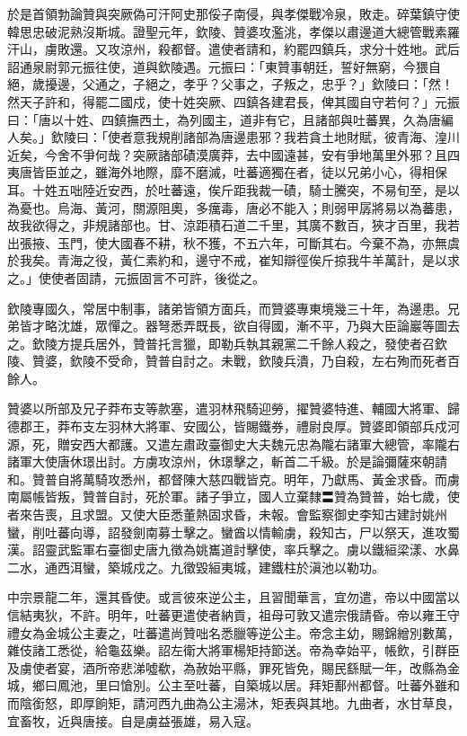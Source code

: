 \begin{pinyinscope}
 於是首領勃論贊與突厥偽可汗阿史那俀子南侵，與孝傑戰冷泉，敗走。碎葉鎮守使韓思忠破泥熟沒斯城。證聖元年，欽陵、贊婆攻濫洮，孝傑以肅邊道大總管戰素羅汗山，虜敗還。又攻涼州，殺都督。遣使者請和，約罷四鎮兵，求分十姓地。武后詔通泉尉郭元振往使，道與欽陵遇。元振曰：「東贊事朝廷，誓好無窮，今猥自絕，歲擾邊，父通之，子絕之，孝乎？父事之，子叛之，忠乎？」欽陵曰：「然！然天子許和，得罷二國戍，使十姓突厥、四鎮各建君長，俾其國自守若何？」元振曰：「唐以十姓、四鎮撫西土，為列國主，道非有它，且諸部與吐蕃異，久為唐編人矣。」欽陵曰：「使者意我規削諸部為唐邊患邪？我若貪土地財賦，彼青海、湟川近矣，今舍不爭何哉？突厥諸部磧漠廣莽，去中國遠甚，安有爭地萬里外邪？且四夷唐皆臣並之，雖海外地際，靡不磨滅，吐蕃適獨在者，徒以兄弟小心，得相保耳。十姓五咄陸近安西，於吐蕃遠，俟斤距我裁一磧，騎士騰突，不易旬至，是以為憂也。烏海、黃河，關源阻奧，多癘毒，唐必不能入；則弱甲孱將易以為蕃患，故我欲得之，非規諸部也。甘、涼距積石道二千里，其廣不數百，狹才百里，我若出張掖、玉門，使大國春不耕，秋不獲，不五六年，可斷其右。今棄不為，亦無虞於我矣。青海之役，黃仁素約和，邊守不戒，崔知辯徑俟斤掠我牛羊萬計，是以求之。」使使者固請，元振固言不可許，後從之。



 欽陵專國久，常居中制事，諸弟皆領方面兵，而贊婆專東境幾三十年，為邊患。兄弟皆才略沈雄，眾憚之。器弩悉弄既長，欲自得國，漸不平，乃與大臣論巖等圖去之。欽陵方提兵居外，贊普托言獵，即勒兵執其親黨二千餘人殺之，發使者召欽陵、贊婆，欽陵不受命，贊普自討之。未戰，欽陵兵潰，乃自殺，左右殉而死者百餘人。



 贊婆以所部及兄子莽布支等款塞，遣羽林飛騎迎勞，擢贊婆特進、輔國大將軍、歸德郡王，莽布支左羽林大將軍、安國公，皆賜鐵券，禮尉良厚。贊婆即領部兵戍河源，死，贈安西大都護。又遣左肅政臺御史大夫魏元忠為隴右諸軍大總管，率隴右諸軍大使唐休璟出討。方虜攻涼州，休璟擊之，斬首二千級。於是論彌薩來朝請和。贊普自將萬騎攻悉州，都督陳大慈四戰皆克。明年，乃獻馬、黃金求昏。而虜南屬帳皆叛，贊普自討，死於軍。諸子爭立，國人立棄隸〓贊為贊普，始七歲，使者來告喪，且求盟。又使大臣悉董熱固求昏，未報。會監察御史李知古建討姚州蠻，削吐蕃向導，詔發劍南募士擊之。蠻酋以情輸虜，殺知古，尸以祭天，進攻蜀漢。詔靈武監軍右臺御史唐九徵為姚巂道討擊使，率兵擊之。虜以鐵絙梁漾、水鼻二水，通西洱蠻，築城戍之。九徵毀絙夷城，建鐵柱於滇池以勒功。



 中宗景龍二年，還其昏使。或言彼來逆公主，且習聞華言，宜勿遣，帝以中國當以信結夷狄，不許。明年，吐蕃更遣使者納貢，祖母可敦又遣宗俄請昏。帝以雍王守禮女為金城公主妻之，吐蕃遣尚贊咄名悉臘等逆公主。帝念主幼，賜錦繒別數萬，雜伎諸工悉從，給龜茲樂。詔左衛大將軍楊矩持節送。帝為幸始平，帳飲，引群臣及虜使者宴，酒所帝悲涕噓欷，為赦始平縣，罪死皆免，賜民繇賦一年，改縣為金城，鄉曰鳳池，里曰愴別。公主至吐蕃，自築城以居。拜矩鄯州都督。吐蕃外雖和而陰銜怒，即厚餉矩，請河西九曲為公主湯沐，矩表與其地。九曲者，水甘草良，宜畜牧，近與唐接。自是虜益張雄，易入寇。




\end{pinyinscope}
